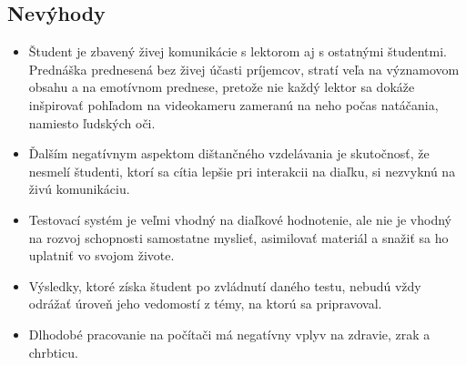 \documentclass[10pt,oneside,slovak,a4paper]{article}
\begin{document}
\subsection{Nevýhody}
\begin{itemize}
	\item Študent je zbavený živej komunikácie s lektorom aj s ostatnými študentmi. Prednáška prednesená bez živej účasti príjemcov, stratí veľa na významovom obsahu a na emotívnom prednese, pretože nie každý lektor sa dokáže inšpirovať pohľadom na videokameru zameranú na neho počas natáčania, namiesto ľudských oči.
	\item Ďalším negatívnym aspektom dištančného vzdelávania je skutočnosť, že nesmelí študenti, ktorí sa cítia lepšie pri interakcii na diaľku, si nezvyknú na živú komunikáciu.
	\item Testovací systém je veľmi vhodný na diaľkové hodnotenie, ale nie je vhodný na rozvoj schopnosti samostatne myslieť, asimilovať materiál a snažiť sa ho uplatniť vo svojom živote.
	\item Výsledky, ktoré získa študent po zvládnutí daného testu, nebudú vždy odrážať úroveň jeho vedomostí z témy, na ktorú sa pripravoval.
	\item Dlhodobé pracovanie na počítači má negatívny vplyv na zdravie, zrak a chrbticu.
\end{itemize}











\end{document}
